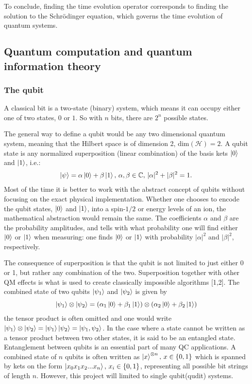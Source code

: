To conclude, finding the time evolution operator corresponds to finding the solution to the Schrödinger equation, which governs the time evolution of quantum systems.

\subsection{Quantum computation and quantum information theory}
\subsubsection{The qubit}
A classical bit is a two-state (binary) system, which means it can occupy either one of two states, $0$ or $1$. So with $n$ bits, there are $2^n$ possible states.

The general way to define a qubit would be any two dimensional quantum system, meaning that the Hilbert space is of dimension 2, $\text{dim}(\mathcal{H}) = 2$. A qubit state is any normalized superposition (linear combination) of the basis kets $\ket{0}$ and $\ket{1}$, i.e.:
\begin{equation}
\label{eq:qubit}
\ket{\psi} = \alpha\ket{0} + \beta\ket{1},\,\alpha,\beta \in \mathbb{C},\, |\alpha|^2 + |\beta|^2 = 1.
\end{equation}
Most of the time it is better to work with the abstract concept of qubits without focusing on the exact physical implementation. Whether one chooses to encode the qubit states, $\ket{0}$ and $\ket{1}$, into a spin-$1/2$ or energy levels of an ion, the mathematical abstraction would remain the same. The coefficients $\alpha$ and $\beta$ are the probability amplitudes, and tells with what probability one will find either $\ket{0}$ or $\ket{1}$ when measuring: one finds $\ket{0}$ or $\ket{1}$ with probability $|\alpha|^2$ and $|\beta|^2$, respectively.

The consequence of superposition is that the qubit is not limited to just either 0 or 1, but rather any combination of the two. Superposition together with other QM effects is what is used to create classically impossible algorithms [1,2]. The combined state of two qubits $\ket{\psi_1}$ and $\ket{\psi_2}$ is given by 
\begin{equation}
\ket{\psi_1} \otimes \ket{\psi_2} = (\alpha_1\ket{0} + \beta_1\ket{1})\otimes(\alpha_2\ket{0} + \beta_2\ket{1})
\end{equation}
the tensor product is often omitted and one would write $\ket{\psi_1} \otimes \ket{\psi_2} = \ket{\psi_1}\ket{\psi_2} = \ket{\psi_1, \psi_2}$. In the case where a state cannot be written as a tensor product between two other states, it is said to be an entangled state. Entanglement between qubits is an essential part of many QC applications. A combined state of $n$ qubits is often written as $\ket{x}^{\otimes n},\, x \in \{0,1\}$ which is spanned by kets on the form $\ket{x_0x_1x_2...x_n},\, x_i \in \{0,1\}$, representing all possible bit strings of length $n$. However, this project will limited to single qubit(qudit) systems.

